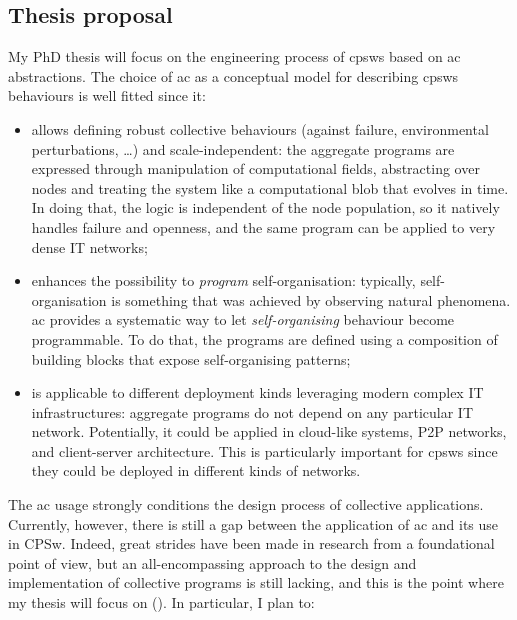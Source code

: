 \documentclass[11pt]{article}
\begin{document}
\subsection{Thesis proposal}
My PhD thesis will focus on the engineering process of \acp{cpsw} based on \ac{ac} abstractions. 
%
The choice of \ac{ac} as a conceptual model for describing \acp{cpsw} behaviours is well fitted since it:
\begin{itemize}
	\item allows defining robust collective behaviours (against failure, environmental perturbations, \dots{}) and scale-independent: 
	the aggregate programs are expressed through manipulation of computational fields, abstracting over nodes and treating the system like a computational blob that evolves in time. 
	In doing that, the logic is independent of the node population, so it natively handles failure and openness, and the same program can be applied to very dense IT networks;
	\item enhances the possibility to \textit{program} self-organisation: typically, self-organisation is something that was achieved by observing natural phenomena. 
	\ac{ac} provides a systematic way to let \textit{self-organising} behaviour become programmable.
	To do that, the programs are defined using a composition of building blocks that expose self-organising patterns;
	\item is applicable to different deployment kinds leveraging modern complex IT infrastructures: aggregate programs do not depend on any particular IT network. 
	Potentially, it could be applied in cloud-like systems, P2P networks, and client-server architecture. 
	This is particularly important for \acp{cpsw} since they could be deployed in different kinds of networks.
\end{itemize}
The \ac{ac} usage strongly conditions the design process of collective applications.
%
Currently, however, there is still a gap between the application of \ac{ac} and its use in CPSw. 
%
Indeed, great strides have been made in research from a foundational point of view, but an all-encompassing approach to the design and implementation of collective programs is still lacking, and this is the point where my thesis will focus on ().
%
In particular, I plan to:
\end{document}
